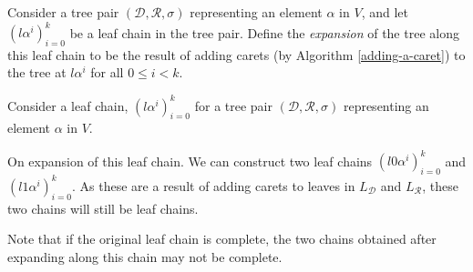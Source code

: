 \documentclass[12pt]{amsart}
\newcommand{\Z}{\mathbb{Z}}
\newcommand{\D}{\mathcal{D}}
\newcommand{\R}{\mathcal{R}}
\begin{document}
\begin{comment}
\begin{definition}[Leaves and neutral leaves]
\label{leaves-and-neutral-leaves}
    Consider a tree pair $(\D,\R,\sigma)$ representing an element $\alpha$ in $V$. Define elements of $L_\D\cup L_\R$ to be \textit{leaves} of the tree pair, and elements of $L_\D\cap L_\R$ to be \textit{neutral leaves} of the tree pair.
    
    Neutral leaves have the property that you can apply $\sigma$ and $\sigma^{-1}$ to them to obtain another leaf.
\end{definition}



\begin{definition}[Leaf chain]
\label{leaf-chain}
    Consider a tree pair $(\D,\R,\sigma)$ representing an element $\alpha$ in $V$, and let $l$ be a leaf in $L_\D$. Define a \textit{leaf chain starting at l} to be any sequence of leaves $(l_0, l_1, ..., l_k)$ with $k\in\Z_{>0}$ such that:
    \begin{itemize}     
        \item $l_0=l$
        \item $l_{i+1}=l_i\sigma$ for all $0\leq i\leq k-1$
        \item $l_i$ is a neutral leaf for all $1\leq i\leq k-1$
    \end{itemize}
    Note that by this definition, a leaf chain does not have to start or end with a neutral leaf.
\end{definition}

\end{comment}

\begin{definition}
\label{chain-expansion}
    Consider a tree pair $(\D,\R,\sigma)$ representing an element $\alpha$ in $V$, and let $(l \alpha^i)_{i=0}^k$ be a leaf chain in the tree pair. Define the \textit{expansion} of the tree along this leaf chain to be the result of adding carets (by Algorithm \ref{adding-a-caret}) to the tree at $l\alpha^i$ for all $0\leq i < k$.
\end{definition}

\begin{remark}
Consider a leaf chain, $(l \alpha^i)_{i=0}^k$ for a tree pair $(\D,\R,\sigma)$ representing an element $\alpha$ in $V$.

On expansion of this leaf chain. We can construct two leaf chains $(l0\alpha^i)_{i=0}^k$ and $(l1\alpha^i)_{i=0}^k$. As these are a result of adding carets to leaves in $L_\D$ and $L_\R$, these two chains will still be leaf chains.
\linebreak

Note that if the original leaf chain is complete, the two chains obtained after expanding along this chain may not be complete.
\end{remark}
\end{document}
